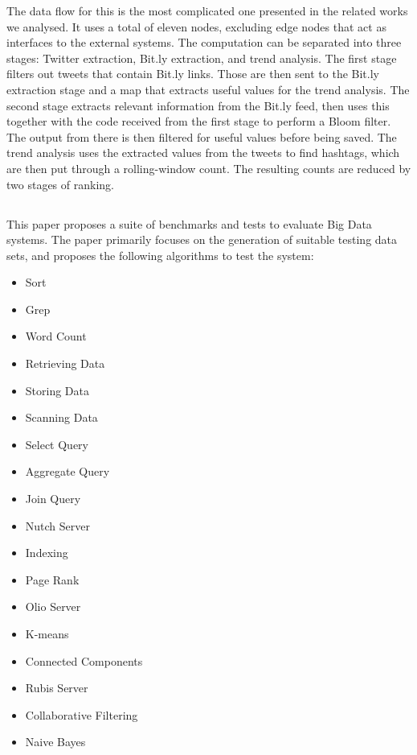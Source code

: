 The data flow for this is the most complicated one presented in the related works we analysed. It uses a total of eleven nodes, excluding edge nodes that act as interfaces to the external systems. The computation can be separated into three stages: Twitter extraction, Bit.ly extraction, and trend analysis. The first stage filters out tweets that contain Bit.ly links. Those are then sent to the Bit.ly extraction stage and a map that extracts useful values for the trend analysis. The second stage extracts relevant information from the Bit.ly feed, then uses this together with the code received from the first stage to perform a Bloom filter. The output from there is then filtered for useful values before being saved. The trend analysis uses the extracted values from the tweets to find hashtags, which are then put through a rolling-window count. The resulting counts are reduced by two stages of ranking.

\subsection{}
This paper proposes a suite of benchmarks and tests to evaluate Big Data systems. The paper primarily focuses on the generation of suitable testing data sets, and proposes the following algorithms to test the system:

\begin{multicols}{2}
  \begin{itemize}
  \item Sort
  \item Grep
  \item Word Count
  \item Retrieving Data
  \item Storing Data
  \item Scanning Data
  \item Select Query
  \item Aggregate Query
  \item Join Query
  \item Nutch Server
  \item Indexing
  \item Page Rank
  \item Olio Server
  \item K-means
  \item Connected Components
  \item Rubis Server
  \item Collaborative Filtering
  \item Naive Bayes
  \end{itemize}
\end{multicols}

